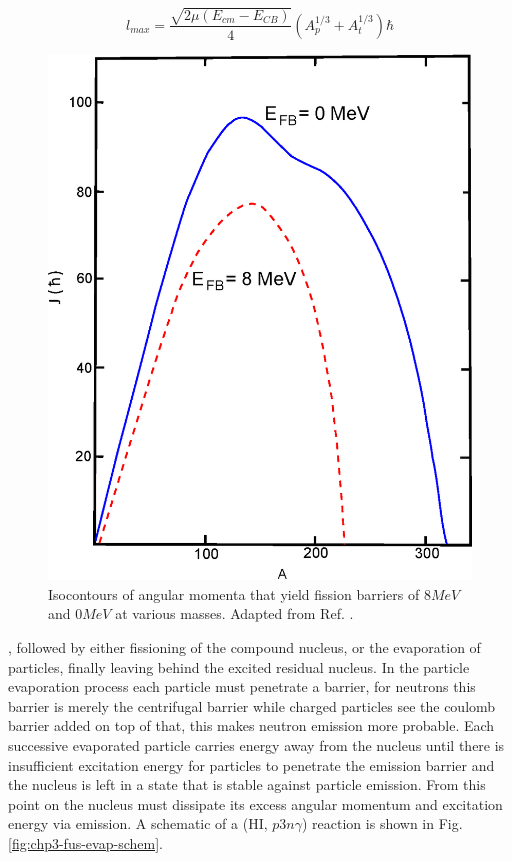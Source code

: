 \begin{equation}
\label{eqn:cn_lmax}
l_{max} = \frac{\sqrt{2\mu(E_{cm}-E_{CB})}}{4}(A^{1/3}_p + A^{1/3}_t)\hbar
\end{equation}
\begin{figure}[h!]
	\centerline{\includegraphics[width=\textwidth]{./img/c3/fission_barrier.eps}}
	\caption{Isocontours of angular momenta that yield fission barriers of $8MeV$ and $0MeV$ at various masses. Adapted from Ref. \cite{fissionBarrier2}.}
	\label{fig:chp3-fission-barrier}
\end{figure}
, followed by either fissioning of the compound nucleus, or the evaporation of particles, finally leaving behind the excited residual nucleus. In the particle evaporation process each particle must penetrate a barrier, for neutrons this barrier is merely the centrifugal barrier while charged particles see the coulomb barrier added on top of that, this makes neutron emission more probable. Each successive evaporated particle carries energy away from the nucleus until there is insufficient excitation energy for particles to penetrate the emission barrier and the nucleus is left in a state that is stable against particle emission. From this point on the nucleus must dissipate its excess angular momentum and excitation energy via \gr{} emission. A schematic of a (HI, $p3n\gamma{}$) reaction is shown in Fig. \ref{fig:chp3-fus-evap-schem}.
